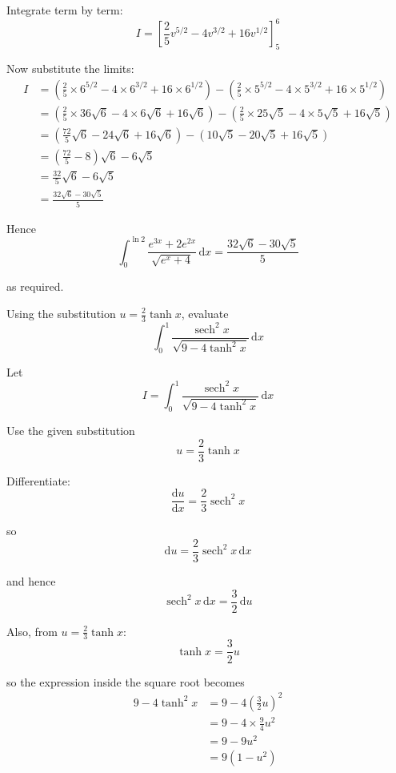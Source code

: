 \documentclass[leqno]{article}
\begin{document}
\begin{enumerate}[
  label=\textbf{\arabic*.},
  leftmargin=*,
  topsep=0pt,
  partopsep=0pt,
  parsep=0pt
]
\begin{djsSolution}
Integrate term by term:
\[
I=\left[\frac{2}{5}v^{5/2}-4v^{3/2}+16v^{1/2}\right]_5^6
\]

Now substitute the limits:
\begin{align*}
I&=\left(\frac{2}{5}\times 6^{5/2}-4\times 6^{3/2}+16\times 6^{1/2}\right)
-\left(\frac{2}{5}\times 5^{5/2}-4\times 5^{3/2}+16\times 5^{1/2}\right)\\
&=\left(\frac{2}{5}\times 36\sqrt6-4\times 6\sqrt6+16\sqrt6\right)
-\left(\frac{2}{5}\times 25\sqrt5-4\times 5\sqrt5+16\sqrt5\right)\\
&=\left(\frac{72}{5}\sqrt6-24\sqrt6+16\sqrt6\right)
-\left(10\sqrt5-20\sqrt5+16\sqrt5\right)\\
&=\left(\frac{72}{5}-8\right)\sqrt6-6\sqrt5\\
&=\frac{32}{5}\sqrt6-6\sqrt5\\
&=\frac{32\sqrt6-30\sqrt5}{5}
\end{align*}

Hence
\[
\int_0^{\ln 2} \frac{e^{3x}+2e^{2x}}{\sqrt{e^x+4}}\,\mathrm{d}x
= \frac{32\sqrt6-30\sqrt5}{5}
\]

as required.
\end{djsSolution}


\newpage

\questionitem

Using the substitution $u = \frac{2}{3}\tanh x$, evaluate
\[
\int_0^1 \frac{\operatorname{sech}^2 x}{\sqrt{9 - 4\tanh^2 x}}\,\mathrm{d}x
\]

\vspace*{10pt}

\begin{djsSolution}
Let
\[
I=\int_0^1 \frac{\operatorname{sech}^2 x}{\sqrt{9-4\tanh^2 x}}\,\mathrm{d}x
\]

Use the given substitution
\[
u=\frac{2}{3}\tanh x
\]

Differentiate:
\[
\frac{\mathrm{d}u}{\mathrm{d}x}=\frac{2}{3}\operatorname{sech}^2 x
\]

so
\[
\mathrm{d}u=\frac{2}{3}\operatorname{sech}^2 x\,\mathrm{d}x
\]

and hence
\[
\operatorname{sech}^2 x\,\mathrm{d}x=\frac{3}{2}\,\mathrm{d}u
\]

Also, from \(u=\frac{2}{3}\tanh x\):
\[
\tanh x=\frac{3}{2}u
\]

so the expression inside the square root becomes
\begin{align*}
9-4\tanh^2 x
&=9-4\left(\frac{3}{2}u\right)^2 \\
&=9-4\times \frac{9}{4}u^2 \\
&=9-9u^2 \\
&=9(1-u^2)
\end{align*}


\end{djsSolution}
\end{enumerate}
\end{document}
